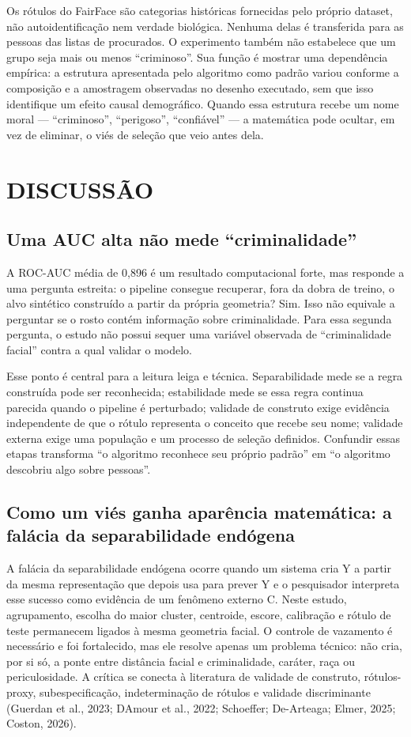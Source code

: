Os rótulos do FairFace são categorias históricas fornecidas pelo próprio dataset, não autoidentificação nem verdade biológica. Nenhuma delas é transferida para as pessoas das listas de procurados. O experimento também não estabelece que um grupo seja mais ou menos ``criminoso''. Sua função é mostrar uma dependência empírica: a estrutura apresentada pelo algoritmo como padrão variou conforme a composição e a amostragem observadas no desenho executado, sem que isso identifique um efeito causal demográfico. Quando essa estrutura recebe um nome moral --- ``criminoso'', ``perigoso'', ``confiável'' --- a matemática pode ocultar, em vez de eliminar, o viés de seleção que veio antes dela.

\chapter{DISCUSSÃO}

\section{Uma AUC alta não mede ``criminalidade''}

A ROC-AUC média de 0,896 é um resultado computacional forte, mas responde a uma pergunta estreita: o pipeline consegue recuperar, fora da dobra de treino, o alvo sintético construído a partir da própria geometria? Sim. Isso não equivale a perguntar se o rosto contém informação sobre criminalidade. Para essa segunda pergunta, o estudo não possui sequer uma variável observada de ``criminalidade facial'' contra a qual validar o modelo.

Esse ponto é central para a leitura leiga e técnica. Separabilidade mede se a regra construída pode ser reconhecida; estabilidade mede se essa regra continua parecida quando o pipeline é perturbado; validade de construto exige evidência independente de que o rótulo representa o conceito que recebe seu nome; validade externa exige uma população e um processo de seleção definidos. Confundir essas etapas transforma ``o algoritmo reconhece seu próprio padrão'' em ``o algoritmo descobriu algo sobre pessoas''.

\section{Como um viés ganha aparência matemática: a falácia da separabilidade endógena}

A falácia da separabilidade endógena ocorre quando um sistema cria Y a partir da mesma representação que depois usa para prever Y e o pesquisador interpreta esse sucesso como evidência de um fenômeno externo C. Neste estudo, agrupamento, escolha do maior cluster, centroide, escore, calibração e rótulo de teste permanecem ligados à mesma geometria facial. O controle de vazamento é necessário e foi fortalecido, mas ele resolve apenas um problema técnico: não cria, por si só, a ponte entre distância facial e criminalidade, caráter, raça ou periculosidade. A crítica se conecta à literatura de validade de construto, rótulos-proxy, subespecificação, indeterminação de rótulos e validade discriminante (Guerdan et al., 2023; D\textquotesingle Amour et al., 2022; Schoeffer; De-Arteaga; Elmer, 2025; Coston, 2026).

